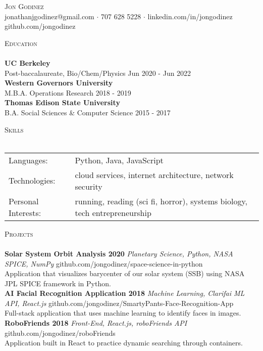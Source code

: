 \documentclass[a4paper]{article}
\newcommand{\lineunder} {
    \vspace*{-8pt} \\
    \hspace*{-18pt} \hrulefill \\
}
\newcommand{\header} [1] {
    {\hspace*{-18pt}\vspace*{6pt} \textsc{#1}}
    \vspace*{-6pt} \lineunder
}
\begin{document}
\vspace*{-40pt}

    

\vspace*{-10pt}
\begin{center}
	{\Huge \scshape {Jon Godinez}}\\
	jonathanjgodinez@gmail.com $\cdot$ 707 628 5228 $\cdot$ linkedin.com/in/jongodinez \textbar{} github.com/jongodinez\\
\end{center}

\header{Education}
\textbf{UC Berkeley}\\
Post-baccalaureate, Bio/Chem/Physics \hfill Jun 2020 - Jun 2022\\
\vspace{2mm}
\textbf{Western Governors University}\\
M.B.A. Operations Research \hfill 2018 - 2019\\
\vspace{2mm}
\textbf{Thomas Edison State University}\\
B.A. Social Sciences \& Computer Science \hfill 2015 - 2017\\
\vspace{2mm}

\header{Skills}
\begin{tabular}{ l l }
	Languages:          & Python, Java, JavaScript                                                  \\
	Technologies:       & cloud services, internet architecture, network security                   \\
	Personal Interests: & running, reading (sci fi, horror), systems biology, tech entrepreneurship \\
\end{tabular}
\vspace{2mm}

\header{Projects}
{\textbf{Solar System Orbit Analysis \textbar{} 2020 \textbar{}}} {\sl Planetary Science, Python, NASA SPICE, NumPy} \hfill github.com/jongodinez/space-science-in-python\\
Application that visualizes barycenter of our solar system (SSB) using NASA JPL SPICE framework in Python.\\
\vspace*{2mm}
{\textbf{AI Facial Recognition Application \textbar{} 2018 \textbar{}}} {\sl Machine Learning, Clarifai ML API, React.js} \hfill github.com/jongodinez/SmartyPants-Face-Recognition-App\\
Full-stack application that uses machine learning to identify faces in images.\\
\vspace*{2mm}
{\textbf{RoboFriends \textbar{} 2018 \textbar{}}} {\sl Front-End, React.js, roboFriends API} \hfill github.com/jongodinez/roboFriends\\
Application built in React to practice dynamic searching through containers.\\
\vspace*{2mm}
\end{document}
